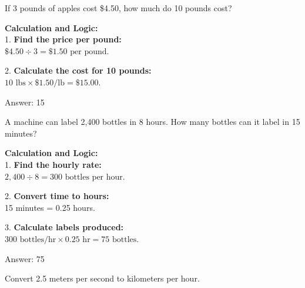 \documentclass[11pt,paper=a4,answers]{exam}
\begin{document}
\begin{questions}
\question
If 3 pounds of apples cost \$4.50, how much do 10 pounds cost?

\begin{solution}
\textbf{Calculation and Logic:} \\
1. \textbf{Find the price per pound:} \\
$\$4.50 \div 3 = \$1.50 \text{ per pound}$.

\vspace{15pt}

2. \textbf{Calculate the cost for 10 pounds:} \\
$10 \text{ lbs} \times \$1.50/\text{lb} = \$15.00$.

\vspace{30pt}

Answer: \colorbox{yellow!100}{15}
\end{solution}

\vspace{60pt}

\question
A machine can label 2,400 bottles in 8 hours. How many bottles can it label in 15 minutes?

\begin{solution}
\textbf{Calculation and Logic:} \\
1. \textbf{Find the hourly rate:} \\
$2,400 \div 8 = 300 \text{ bottles per hour}$.

\vspace{15pt}

2. \textbf{Convert time to hours:} \\
15 minutes = 0.25 hours.

\vspace{15pt}

3. \textbf{Calculate labels produced:} \\
$300 \text{ bottles/hr} \times 0.25 \text{ hr} = 75 \text{ bottles}$.

\vspace{30pt}

Answer: \colorbox{yellow!100}{75}
\end{solution}

\vspace{60pt}

\question
Convert 2.5 meters per second to kilometers per hour.


\end{questions}
\end{document}
